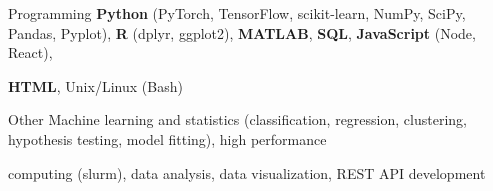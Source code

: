 

\begin{cvskills}
  \cvskill
  {Programming}
  {\textbf{Python} (PyTorch, TensorFlow, scikit-learn, NumPy, SciPy, Pandas, Pyplot),
    \textbf{R} (dplyr, ggplot2), \textbf{MATLAB}, \textbf{SQL}, \textbf{JavaScript} (Node, React),}

  \cvskill
  {}
  {\textbf{HTML}, Unix/Linux (Bash)}

  \cvskill
  {Other}
  {Machine learning and statistics (classification, regression, clustering,
    hypothesis testing, model fitting), high performance}

  \cvskill
  {}
  {computing (slurm), data analysis, data visualization, REST API development}
\end{cvskills}
